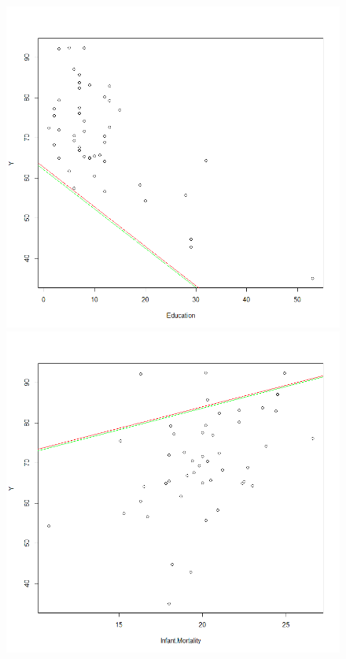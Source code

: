 \documentclass[a4paper,12pt]{article}
\begin{document}
\begin{figure}[H]
\begin{minipage}[]{0.24\textwidth}
 \end{minipage}
 \begin{minipage}[]{0.24\textwidth}
  \includegraphics[width=\textwidth]{figures/Lab2A1_lr_E.png}  
 \end{minipage}
 \begin{minipage}[]{0.24\textwidth}
  \includegraphics[width=\textwidth]{figures/lab2A1_lr_IM.png}  
 \end{minipage}
\end{figure}
\end{document}

